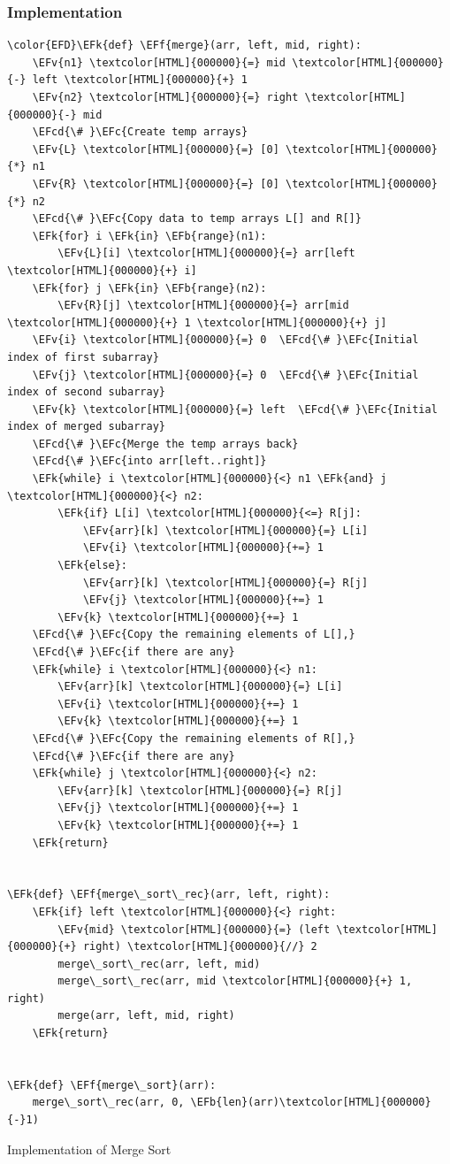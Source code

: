 \documentclass[a4paper,12pt]{article}
\newcommand{\EFc}[1]{\textcolor{EFc}{#1}} %
\newcommand{\EFcd}[1]{\textcolor{EFcd}{#1}} %
\newcommand{\EFk}[1]{\textcolor{EFk}{#1}} %
\newcommand{\EFb}[1]{\textcolor{EFb}{#1}} %
\newcommand{\EFf}[1]{\textcolor{EFf}{#1}} %
\newcommand{\EFv}[1]{\textcolor{EFv}{#1}} %
\begin{document}
\subsubsection{Implementation}
\label{sec:org8d338da}
\begin{listing}[htbp]
\begin{Code}
\begin{Verbatim}
\color{EFD}\EFk{def} \EFf{merge}(arr, left, mid, right):
    \EFv{n1} \textcolor[HTML]{000000}{=} mid \textcolor[HTML]{000000}{-} left \textcolor[HTML]{000000}{+} 1
    \EFv{n2} \textcolor[HTML]{000000}{=} right \textcolor[HTML]{000000}{-} mid
    \EFcd{\# }\EFc{Create temp arrays}
    \EFv{L} \textcolor[HTML]{000000}{=} [0] \textcolor[HTML]{000000}{*} n1
    \EFv{R} \textcolor[HTML]{000000}{=} [0] \textcolor[HTML]{000000}{*} n2
    \EFcd{\# }\EFc{Copy data to temp arrays L[] and R[]}
    \EFk{for} i \EFk{in} \EFb{range}(n1):
        \EFv{L}[i] \textcolor[HTML]{000000}{=} arr[left \textcolor[HTML]{000000}{+} i]
    \EFk{for} j \EFk{in} \EFb{range}(n2):
        \EFv{R}[j] \textcolor[HTML]{000000}{=} arr[mid \textcolor[HTML]{000000}{+} 1 \textcolor[HTML]{000000}{+} j]
    \EFv{i} \textcolor[HTML]{000000}{=} 0  \EFcd{\# }\EFc{Initial index of first subarray}
    \EFv{j} \textcolor[HTML]{000000}{=} 0  \EFcd{\# }\EFc{Initial index of second subarray}
    \EFv{k} \textcolor[HTML]{000000}{=} left  \EFcd{\# }\EFc{Initial index of merged subarray}
    \EFcd{\# }\EFc{Merge the temp arrays back}
    \EFcd{\# }\EFc{into arr[left..right]}
    \EFk{while} i \textcolor[HTML]{000000}{<} n1 \EFk{and} j \textcolor[HTML]{000000}{<} n2:
        \EFk{if} L[i] \textcolor[HTML]{000000}{<=} R[j]:
            \EFv{arr}[k] \textcolor[HTML]{000000}{=} L[i]
            \EFv{i} \textcolor[HTML]{000000}{+=} 1
        \EFk{else}:
            \EFv{arr}[k] \textcolor[HTML]{000000}{=} R[j]
            \EFv{j} \textcolor[HTML]{000000}{+=} 1
        \EFv{k} \textcolor[HTML]{000000}{+=} 1
    \EFcd{\# }\EFc{Copy the remaining elements of L[],}
    \EFcd{\# }\EFc{if there are any}
    \EFk{while} i \textcolor[HTML]{000000}{<} n1:
        \EFv{arr}[k] \textcolor[HTML]{000000}{=} L[i]
        \EFv{i} \textcolor[HTML]{000000}{+=} 1
        \EFv{k} \textcolor[HTML]{000000}{+=} 1
    \EFcd{\# }\EFc{Copy the remaining elements of R[],}
    \EFcd{\# }\EFc{if there are any}
    \EFk{while} j \textcolor[HTML]{000000}{<} n2:
        \EFv{arr}[k] \textcolor[HTML]{000000}{=} R[j]
        \EFv{j} \textcolor[HTML]{000000}{+=} 1
        \EFv{k} \textcolor[HTML]{000000}{+=} 1
    \EFk{return}


\EFk{def} \EFf{merge\_sort\_rec}(arr, left, right):
    \EFk{if} left \textcolor[HTML]{000000}{<} right:
        \EFv{mid} \textcolor[HTML]{000000}{=} (left \textcolor[HTML]{000000}{+} right) \textcolor[HTML]{000000}{//} 2
        merge\_sort\_rec(arr, left, mid)
        merge\_sort\_rec(arr, mid \textcolor[HTML]{000000}{+} 1, right)
        merge(arr, left, mid, right)
    \EFk{return}


\EFk{def} \EFf{merge\_sort}(arr):
    merge\_sort\_rec(arr, 0, \EFb{len}(arr)\textcolor[HTML]{000000}{-}1)
\end{Verbatim}
\end{Code}
\caption{\label{lst:orgff19348}Implementation of Merge Sort}
\end{listing}
\end{document}
